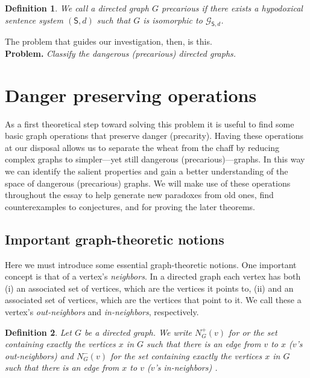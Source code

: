 \documentclass[12pt]{kluwer}
\newtheorem{defn}{Definition}
\theoremstyle{remark}
\newcommand{\fancy}[1]{\mathcal{#1}}
\def\S{\textsf{S}}
\def\G{\fancy{G}}
\begin{document}
\begin{defn}
We call a directed graph $G$ \emph{precarious} if there exists a hypodoxical sentence system $(\S, d)$ such that $G$ is isomorphic to $\G_{\S, d}$.
\end{defn}

The problem that guides our investigation, then, is this.\\

\textbf{Problem.} \textit{Classify the dangerous (precarious) directed graphs.}


\section{Danger preserving operations}
\label{sec3}

As a first theoretical step toward solving this problem it is useful to find some basic graph operations that preserve danger (precarity). Having these operations at our disposal allows us to separate the wheat from the chaff by reducing complex graphs to simpler---yet still dangerous (precarious)---graphs. In this way we can identify the salient properties and gain a better understanding of the space of dangerous (precarious) graphs. We will make use of these operations throughout the essay to help generate new paradoxes from old ones, find counterexamples to conjectures, and for proving the later theorems.

\subsection{Important graph-theoretic notions}

Here we must introduce some essential graph-theoretic notions. One important concept is that of a vertex's \textit{neighbors}. In a directed graph each vertex has both (i) an associated set of vertices, which are the vertices it points to, (ii) and an associated set of vertices, which are the vertices that point to it. We call these a vertex's \textit{out-neighbors} and \textit{in-neighbors}, respectively.

\begin{defn}
Let $G$ be a directed graph.  We write $N^{+}_G(v)$ for or the set containing exactly the vertices $x$ in $G$ such that there is an edge from $v$ to $x$ ($v$'s out-neighbors) and $N^{-}_G(v)$ for the set containing exactly the vertices $x$ in $G$ such that there is an edge from $x$ to $v$ ($v$'s in-neighbors) .
\end{defn}
\end{document}
